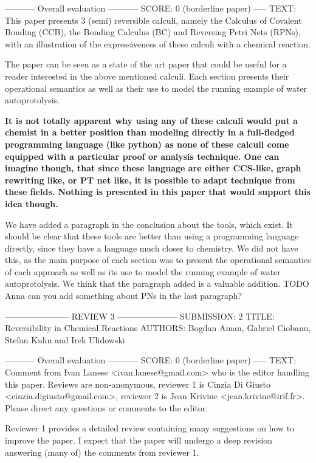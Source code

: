 \documentclass{article}
\begin{document}
----------- Overall evaluation -----------
SCORE: 0 (borderline paper)
----- TEXT:
This paper presents 3 (semi) reversible calculi, namely the Calculus of Covalent Bonding (CCB), the Bonding Calculus (BC) and Reversing Petri Nets (RPNs), with an illustration of the expressiveness of these calculi with a chemical reaction.

The paper can be seen as a state of the art paper that could be useful for a reader interested in the above mentioned calculi. Each section presents their operational semantics as well as their use to model the running example of water autoprotolysis.

\textbf{It is not totally apparent why using any of these calculi would put a chemist in a better position than modeling directly in a full-fledged programming language (like python) as none of these calculi come equipped with a particular proof or analysis technique.  One can imagine though, that since these language are either CCS-like, graph rewriting like, or PT net like, it is possible to adapt technique from these fields. Nothing is presented in this paper that would support this idea though.}

We have added a paragraph in the conclusion about the tools, which exist. It should be clear that these tools are better than using a programming language directly, since they have a language much closer to chemistry. We did not have this, as the main purpose of each section was to present the operational semantics of each approach as well as its use to model the running example of water autoprotolysis. We think that the paragraph added is a valuable addition. TODO Anna can you add something about PNs in the last paragraph?

----------------------- REVIEW 3 ---------------------
SUBMISSION: 2
TITLE: Reversibility in Chemical Reactions
AUTHORS: Bogdan Aman, Gabriel Ciobanu, Stefan Kuhn and Irek Ulidowski

----------- Overall evaluation -----------
SCORE: 0 (borderline paper)
----- TEXT:
Comment from Ivan Lanese <ivan.lanese@gmail.com> who is the editor handling this paper. Reviews are non-anonymous, reviewer 1 is Cinzia Di Giusto <cinzia.digiusto@gmail.com>, reviewer 2 is Jean Krivine <jean.krivine@irif.fr>. Please direct any questions or comments to the editor.

Reviewer 1 provides a detailed review containing many suggestions on how to improve the paper. I expect that the paper will undergo a deep revision answering (many of) the comments from reviewer 1.
\end{document}
